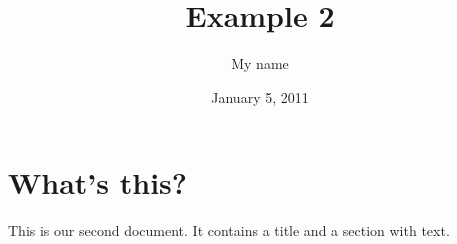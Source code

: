 \documentclass[a4paper,11pt]{article}
\begin{document}
\title{Example 2}
\author{My name}
\date{January 5, 2011}
\maketitle
\section{What's this?}
This is our second document. It contains a title and a section
with text.
\end{document}
